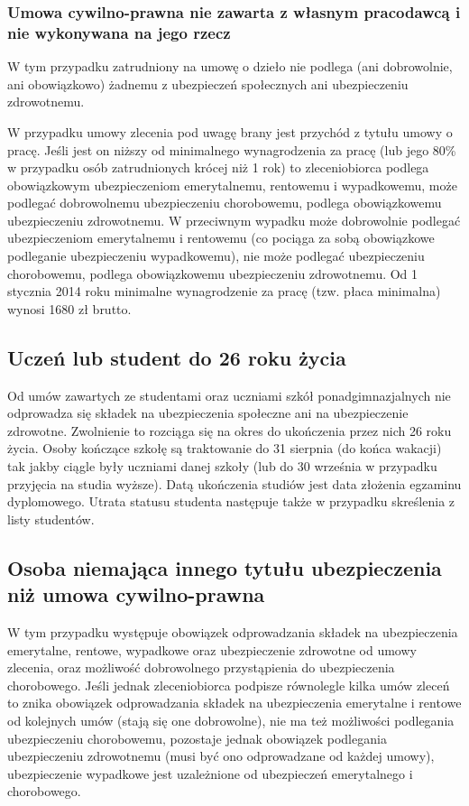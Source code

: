 \subsubsection{Umowa cywilno-prawna nie zawarta z własnym pracodawcą i nie wykonywana na jego rzecz}
W tym przypadku zatrudniony na umowę o dzieło nie podlega (ani dobrowolnie, ani obowiązkowo) żadnemu z ubezpieczeń społecznych ani ubezpieczeniu zdrowotnemu. 

W przypadku umowy zlecenia pod uwagę brany jest przychód z tytułu umowy o pracę. Jeśli jest on niższy od minimalnego wynagrodzenia za pracę (lub jego 80\% w przypadku osób zatrudnionych krócej niż 1 rok) to zleceniobiorca podlega obowiązkowym ubezpieczeniom emerytalnemu, rentowemu i wypadkowemu, może podlegać dobrowolnemu ubezpieczeniu chorobowemu, podlega obowiązkowemu ubezpieczeniu zdrowotnemu. W przeciwnym wypadku może dobrowolnie podlegać ubezpieczeniom emerytalnemu i rentowemu (co pociąga za sobą obowiązkowe podleganie ubezpieczeniu wypadkowemu), nie może podlegać ubezpieczeniu chorobowemu, podlega obowiązkowemu ubezpieczeniu zdrowotnemu. Od 1 stycznia 2014 roku minimalne wynagrodzenie za pracę (tzw. płaca minimalna) wynosi 1680 zł brutto.

\subsection[Uczeń lub student do 26 roku życia][Uczeń lub student do 26 roku życia]{Uczeń lub student do 26 roku życia}
Od umów zawartych ze studentami oraz uczniami szkół ponadgimnazjalnych nie odprowadza się składek na ubezpieczenia społeczne ani na ubezpieczenie zdrowotne. Zwolnienie to rozciąga się na okres do ukończenia przez nich 26 roku życia. Osoby kończące szkołę są traktowanie do 31 sierpnia (do końca wakacji) tak jakby ciągle były uczniami danej szkoły (lub do 30 września w przypadku przyjęcia na studia wyższe). Datą ukończenia studiów jest data złożenia egzaminu dyplomowego. Utrata statusu studenta następuje także w przypadku skreślenia z listy studentów.

\subsection[Osoba niemająca innego tytułu ubezpieczenia niż umowa cywilno-prawna][Osoba niemająca innego tytułu ubezpieczenia niż umowa cywilno-prawna]{Osoba niemająca innego tytułu ubezpieczenia niż umowa cywilno-prawna}
\label{inni}
W tym przypadku występuje obowiązek odprowadzania składek na ubezpieczenia emerytalne, rentowe, wypadkowe oraz ubezpieczenie zdrowotne od umowy zlecenia, oraz możliwość dobrowolnego przystąpienia do ubezpieczenia chorobowego. Jeśli jednak zleceniobiorca podpisze równolegle kilka umów zleceń to znika obowiązek odprowadzania składek na ubezpieczenia emerytalne i rentowe od kolejnych umów (stają się one dobrowolne), nie ma też możliwości podlegania ubezpieczeniu chorobowemu, pozostaje jednak obowiązek podlegania ubezpieczeniu zdrowotnemu (musi być ono odprowadzane od każdej umowy), ubezpieczenie wypadkowe jest uzależnione od ubezpieczeń emerytalnego i chorobowego.

